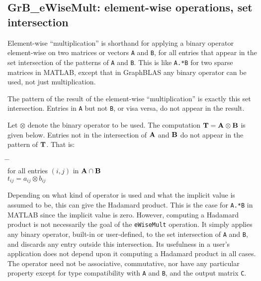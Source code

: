 \documentclass[12pt]{article}
\begin{document}
\newpage
\subsection{{\sf GrB\_eWiseMult:} element-wise operations, set intersection} %
\label{eWiseMult}

Element-wise ``multiplication'' is shorthand for applying a binary operator
element-wise on two matrices or vectors \verb'A' and \verb'B', for all entries
that appear in the set intersection of the patterns of \verb'A' and \verb'B'.
This is like \verb'A.*B' for two sparse matrices in MATLAB, except that in
GraphBLAS any binary operator can be used, not just multiplication.

The pattern of the result of the element-wise ``multiplication'' is exactly
this set intersection.  Entries in \verb'A' but not \verb'B', or visa versa, do
not appear in the result.

Let $\otimes$ denote the binary operator to be used.  The computation ${\bf T =
A \otimes B}$ is given below.  Entries not in the intersection of ${\bf A}$ and
${\bf B}$ do not appear in the pattern of ${\bf T}$.  That is:
    \vspace{-0.2in}
    {\small
    \begin{tabbing}
    \hspace{2em} \= \hspace{2em} \= \hspace{2em} \= \\
    \> for all entries $(i,j)$ in ${\bf A \cap B}$ \\
    \> \> $t_{ij} = a_{ij} \otimes b_{ij}$ \\
    \end{tabbing} }
    \vspace{-0.2in}

Depending on what kind of operator is used and what the implicit value is
assumed to be, this can give the Hadamard product.  This is the case for
\verb'A.*B' in MATLAB since the implicit value is zero.  However, computing a
Hadamard product is not necessarily the goal of the \verb'eWiseMult' operation.
It simply applies any binary operator, built-in or user-defined, to the set
intersection of \verb'A' and \verb'B', and discards any entry outside this
intersection.  Its usefulness in a user's application does not depend upon it
computing a Hadamard product in all cases.  The operator need not be
associative, commutative, nor have any particular property except for type
compatibility with \verb'A' and \verb'B', and the output matrix \verb'C'.
\end{document}

